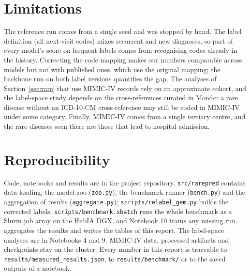 \documentclass[11pt]{article}
\newcommand{\nb}[1]{\texttt{#1}}
\begin{document}
\section{Limitations}

The reference run comes from a single seed and was stopped by hand. The label definition (all next-visit codes)
mixes recurrent and new diagnoses, so part of every model's score on frequent labels comes from recognising codes
already in the history. Correcting the code mapping makes our numbers comparable across models but not with
published ones, which use the original mapping; the backbone run on both label versions quantifies the gap. The
analyses of Section~\ref{sec:rare} that use MIMIC-IV records rely on an approximate cohort, and the label-space
study depends on the cross-references curated in Mondo: a rare disease without an ICD-10-CM cross-reference may
still be coded in MIMIC-IV under some category. Finally, MIMIC-IV comes from a single tertiary centre, and the rare
diseases seen there are those that lead to hospital admission.

\section{Reproducibility}

Code, notebooks and results are in the project repository. \nb{src/rarepred} contains data loading, the model zoo
(\nb{zoo.py}), the benchmark runner (\nb{bench.py}) and the aggregation of results (\nb{aggregate.py});
\nb{scripts/relabel\_gem.py} builds the corrected labels, \nb{scripts/benchmark.sbatch} runs the whole benchmark as a
Slurm job array on the HubIA DGX, and Notebook 10 trains any missing run, aggregates the results and writes the
tables of this report. The label-space analyses are in Notebooks 4 and 9. MIMIC-IV data, processed artifacts and
checkpoints stay on the cluster. Every number in this report is traceable to \nb{results/measured\_results.json},
to \nb{results/benchmark/} or to the saved outputs of a notebook.



\end{document}
